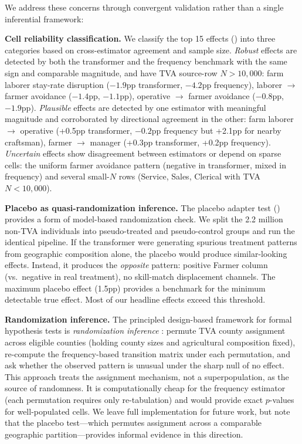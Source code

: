 \documentclass[12pt]{article}
\begin{document}
We address these concerns through convergent validation rather than a single inferential framework:

\textbf{Cell reliability classification.} We classify the top 15 effects () into three categories based on cross-estimator agreement and sample size. \textit{Robust} effects are detected by both the transformer and the frequency benchmark with the same sign and comparable magnitude, and have TVA source-row $N > 10{,}000$: farm laborer stay-rate disruption ($-1.9$pp transformer, $-4.2$pp frequency), laborer $\to$ farmer avoidance ($-1.4$pp, $-1.1$pp), operative $\to$ farmer avoidance ($-0.8$pp, $-1.9$pp). \textit{Plausible} effects are detected by one estimator with meaningful magnitude and corroborated by directional agreement in the other: farm laborer $\to$ operative (+0.5pp transformer, $-0.2$pp frequency but +2.1pp for nearby craftsman), farmer $\to$ manager (+0.3pp transformer, +0.2pp frequency). \textit{Uncertain} effects show disagreement between estimators or depend on sparse cells: the uniform farmer avoidance pattern (negative in transformer, mixed in frequency) and several small-$N$ rows (Service, Sales, Clerical with TVA $N < 10{,}000$).

\textbf{Placebo as quasi-randomization inference.} The placebo adapter test () provides a form of model-based randomization check. We split the 2.2 million non-TVA individuals into pseudo-treated and pseudo-control groups and run the identical pipeline. If the transformer were generating spurious treatment patterns from geographic composition alone, the placebo would produce similar-looking effects. Instead, it produces the \textit{opposite} pattern: positive Farmer column (vs.\ negative in real treatment), no skill-match displacement channels. The maximum placebo effect (1.5pp) provides a benchmark for the minimum detectable true effect. Most of our headline effects exceed this threshold.

\textbf{Randomization inference.} The principled design-based framework for formal hypothesis tests is \textit{randomization inference} \citep{fisher1935, rosenbaum2002}: permute TVA county assignment across eligible counties (holding county sizes and agricultural composition fixed), re-compute the frequency-based transition matrix under each permutation, and ask whether the observed pattern is unusual under the sharp null of no effect. This approach treats the assignment mechanism, not a superpopulation, as the source of randomness. It is computationally cheap for the frequency estimator (each permutation requires only re-tabulation) and would provide exact $p$-values for well-populated cells. We leave full implementation for future work, but note that the placebo test---which permutes assignment across a comparable geographic partition---provides informal evidence in this direction.
\end{document}

